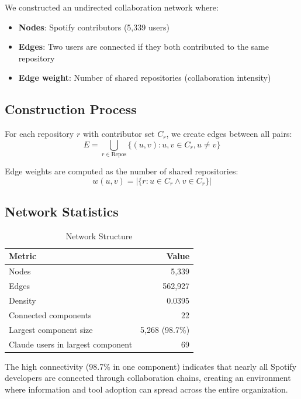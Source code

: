 \documentclass[11pt]{article}
\begin{document}
We constructed an undirected collaboration network where:
\begin{itemize}
    \item \textbf{Nodes}: Spotify contributors (5,339 users)
    \item \textbf{Edges}: Two users are connected if they both contributed to the same repository
    \item \textbf{Edge weight}: Number of shared repositories (collaboration intensity)
\end{itemize}

\subsection{Construction Process}

For each repository $r$ with contributor set $C_r$, we create edges between all pairs:
\begin{equation}
E = \bigcup_{r \in \text{Repos}} \{(u, v) : u, v \in C_r, u \neq v\}
\end{equation}

Edge weights are computed as the number of shared repositories:
\begin{equation}
w(u, v) = |\{r : u \in C_r \land v \in C_r\}|
\end{equation}

\subsection{Network Statistics}

\begin{table}[H]
\centering
\caption{Network Structure}
\label{tab:network}
\begin{tabular}{lr}
\toprule
\textbf{Metric} & \textbf{Value} \\
\midrule
Nodes & 5,339 \\
Edges & 562,927 \\
Density & 0.0395 \\
Connected components & 22 \\
Largest component size & 5,268 (98.7\%) \\
Claude users in largest component & 69 \\
\bottomrule
\end{tabular}
\end{table}

The high connectivity (98.7\% in one component) indicates that nearly all Spotify developers are connected through collaboration chains, creating an environment where information and tool adoption can spread across the entire organization.
\end{document}
